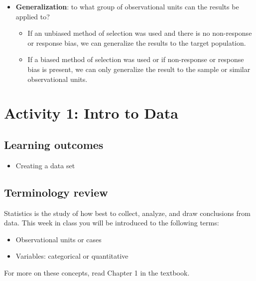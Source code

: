 \documentclass[
]{report}
\providecommand{\tightlist}{%
  \setlength{\itemsep}{0pt}\setlength{\parskip}{0pt}}
\begin{document}
\newpage

\begin{itemize}
\item
  \textbf{Generalization}: to what group of observational units can the results be applied to?

  \begin{itemize}
  \item
    If an unbiased method of selection was used and there is no non-response or response bias, we can generalize the results to the target population.
  \item
    If a biased method of selection was used or if non-response or response bias is present, we can only generalize the result to the sample or similar observational units.
  \end{itemize}
\end{itemize}

\newpage

\section{Activity 1: Intro to Data}\label{activity-1-intro-to-data}


\subsection{Learning outcomes}\label{learning-outcomes}

\begin{itemize}
\tightlist
\item
  Creating a data set
\end{itemize}

\subsection{Terminology review}\label{terminology-review}

Statistics is the study of how best to collect, analyze, and draw conclusions from data. This week in class you will be introduced to the following terms:

\begin{itemize}
\item
  Observational units or cases
\item
  Variables: categorical or quantitative
\end{itemize}

For more on these concepts, read Chapter 1 in the textbook.
\end{document}
